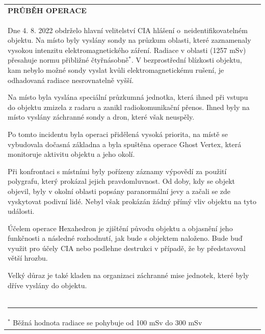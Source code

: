 \documentclass[a4paper, 11pt]{article}
\newlength{\fontheight}
\def\bottomrulewidth{0.3mm}		%
\def\tabtitleextraheight{5pt}	%
\def\tablestretch{1.4}			%
\newcommand{\blackcell}{\cellcolor{black} \color{white} \ttfamily \bfseries}
\newcommand{\tabtitle}[2]{\multicolumn{#1}{l}{\blackcell \MakeUppercase{#2}\rule{0pt}{\dimexpr \fontheight + 1pt + \tabtitleextraheight \relax} } \\ [\tabtitleextraheight]}
\newcommand{\ind}{\hspace*{8mm}}
\begin{document}
	\vspace*{0.5cm}
	\begin{table}[H]
		\renewcommand\tabularxcolumn[1]{m{#1}}
		\def\arraystretch{\tablestretch}
		\begin{tabularx}{\textwidth}{X}
			\tabtitle{1}{průběh operace}
		\ttfamily
		\ind Dne 4. 8. 2022 obdrželo hlavní velitelství CIA hlášení o~neidentifikovatelném objektu. Na místo byly vyslány sondy na průzkum oblasti, které zaznamenaly vysokou intenzitu elektromagnetického záření. Radiace v oblasti (1257 mSv) přesahuje normu přibližné čtyřnásobně$^*$. V bezprostřední blízkosti objektu, kam nebylo možné sondy vyslat kvůli elektromagnetickému rušení, je odhadovaná radiace nesrovnatelně vyšší.
		
		\ind Na místo byla vyslána speciální průzkumná jednotka, která ihned při vstupu do objektu zmizela z radaru a zanikl radiokomunikační přenos. Ihned byly na místo vyslány záchranné sondy a dron, které však neuspěly.
		
		\ind Po tomto incidentu byla operaci přidělená vysoká priorita, na místě se vybudovala dočasná základna a byla spuštěna operace Ghost Vertex, která monitoruje aktivitu objektu a jeho okolí.
		
		\ind Při konfrontaci s místními byly pořízeny záznamy výpovědí za použití polygrafu, který prokázal jejich pravdomluvnost. Od doby, kdy se objekt objevil, byly v okolní oblasti popsány paranormální jevy a začali se zde vyskytovat podivní lidé. Nebyl však prokázán žádný přímý vliv objektu na tyto události.
		
		\ind Účelem operace Hexahedron je zjištění původu objektu a objasnění jeho funkčnosti a následné rozhodnutí, jak bude s objektem naloženo. Bude buď využit pro účely CIA nebo podlehne destrukci v případě, že by představoval větší hrozbu.
		
		\ind Velký důraz je také kladen na organizaci záchranné mise jednotek, které byly dříve vyslány do objektu.\\ \bottomrule[\bottomrulewidth]
		\rule{7cm}{0.1mm} \\[-1.5ex]
		\footnotesize $^*$ Běžná hodnota radiace se pohybuje od 100 mSv do 300 mSv \\
		\end{tabularx}
	\end{table}
	
\end{document}
